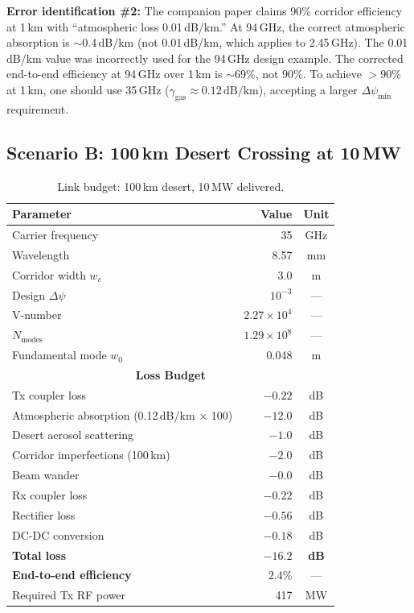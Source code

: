 \documentclass[journal,twocolumn]{IEEEtran}
\begin{document}
\textbf{Error identification \#2:} The companion paper claims 90\%
corridor efficiency at 1\,km with ``atmospheric loss 0.01\,dB/km.''
At 94\,GHz, the correct atmospheric absorption is $\sim$0.4\,dB/km
(not 0.01\,dB/km, which applies to 2.45\,GHz). The 0.01\,dB/km value
was incorrectly used for the 94\,GHz design example. The corrected
end-to-end efficiency at 94\,GHz over 1\,km is $\sim$69\%, not 90\%.
To achieve $>$90\% at 1\,km, one should use 35\,GHz
($\gamma_\text{gas} \approx 0.12\,\text{dB/km}$), accepting a larger
$\Delta\psi_\text{min}$ requirement.

\subsection{Scenario B: 100\,km Desert Crossing at 10\,MW}

\begin{table}[h]
\caption{Link budget: 100\,km desert, 10\,MW delivered.}
\label{tab:link_B}
\centering
\begin{tabular}{lrc}
\toprule
Parameter & Value & Unit \\
\midrule
Carrier frequency & 35 & GHz \\
Wavelength & 8.57 & mm \\
Corridor width $w_c$ & 3.0 & m \\
Design $\Delta\psi$ & $10^{-3}$ & --- \\
V-number & $2.27\times10^4$ & --- \\
$N_\text{modes}$ & $1.29\times10^8$ & --- \\
Fundamental mode $w_0$ & 0.048 & m \\
\midrule
\multicolumn{3}{c}{\textbf{Loss Budget}} \\
\midrule
Tx coupler loss & $-0.22$ & dB \\
Atmospheric absorption (0.12\,dB/km $\times$ 100) & $-12.0$ & dB \\
Desert aerosol scattering & $-1.0$ & dB \\
Corridor imperfections (100\,km) & $-2.0$ & dB \\
Beam wander & $-0.0$ & dB \\
Rx coupler loss & $-0.22$ & dB \\
Rectifier loss & $-0.56$ & dB \\
DC-DC conversion & $-0.18$ & dB \\
\midrule
\textbf{Total loss} & $\mathbf{-16.2}$ & \textbf{dB} \\
\textbf{End-to-end efficiency} & $\mathbf{2.4\%}$ & --- \\
\midrule
Required Tx RF power & 417 & MW \\
\bottomrule
\end{tabular}
\end{table}
\end{document}
